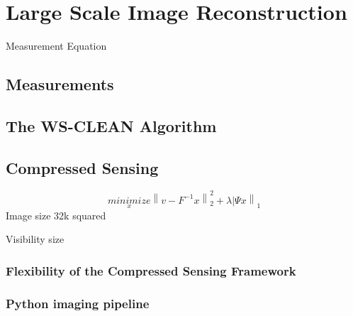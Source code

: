 \section{Large Scale Image Reconstruction} \label{intro}

Measurement Equation

\subsection{Measurements}

\subsection{The WS-CLEAN Algorithm}

\subsection{Compressed Sensing}

\begin{equation}\label{intro:minimize}
	 \underset{x}{minimize} \left \| v - F^{-1}x \right \|^{2}_{2} + \lambda \left |\Psi x  \right \|_1
\end{equation}
Image size 32k squared

Visibility size

\subsubsection{Flexibility of the Compressed Sensing Framework}

\subsubsection{Python imaging pipeline}

